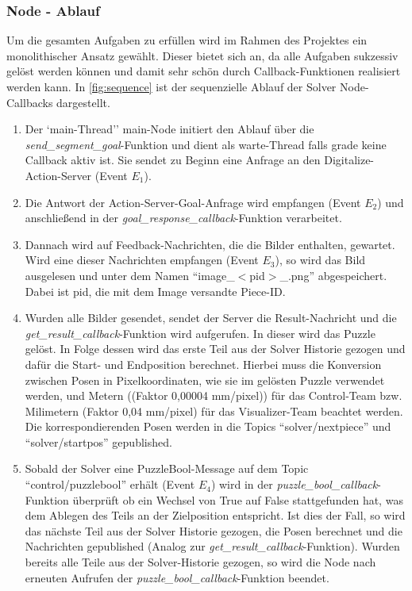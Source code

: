 \subsubsection{Node - Ablauf}
Um die gesamten Aufgaben zu erfüllen wird im Rahmen des Projektes ein monolithischer Ansatz gewählt. Dieser bietet sich an, da alle Aufgaben sukzessiv gelöst werden können und damit sehr schön durch Callback-Funktionen realisiert werden kann. In \autoref{fig:sequence} ist der sequenzielle Ablauf der Solver Node-Callbacks dargestellt. 
\begin{enumerate}
    \item Der `main-Thread'' main-Node initiert den Ablauf über die \textit{send\_segment\_goal}-Funktion und dient als warte-Thread falls grade keine Callback aktiv ist. Sie sendet zu Beginn eine Anfrage an den Digitalize-Action-Server (Event $E_1$). 
    \item Die Antwort der Action-Server-Goal-Anfrage wird empfangen (Event $E_2$) und anschließend in der \textit{goal\_response\_callback}-Funktion verarbeitet.
    \item Dannach wird auf Feedback-Nachrichten, die die Bilder enthalten, gewartet. Wird eine dieser Nachrichten empfangen (Event $E_3$), so wird das Bild ausgelesen und unter dem Namen ``image\_$<$pid$>$\_.png'' abgespeichert. Dabei ist pid, die mit dem Image versandte Piece-ID.
    \item Wurden alle Bilder gesendet, sendet der Server die Result-Nachricht und die \textit{get\_result\_callback}-Funktion wird aufgerufen. In dieser wird das Puzzle gelöst. In Folge dessen wird das erste Teil aus der Solver Historie gezogen und dafür die Start- und Endposition berechnet. Hierbei muss die Konversion zwischen Posen in Pixelkoordinaten, wie sie im gelösten Puzzle verwendet werden, und Metern ((Faktor 0,00004 mm/pixel)) für das Control-Team bzw. Milimetern (Faktor 0,04 mm/pixel) für das Visualizer-Team beachtet werden. Die korrespondierenden Posen werden in die Topics ``solver/nextpiece'' und ``solver/startpos'' gepublished.
    \item Sobald der Solver eine PuzzleBool-Message auf dem Topic ``control/puzzlebool'' erhält (Event $E_4$) wird in der \textit{puzzle\_bool\_callback}-Funktion überprüft ob ein Wechsel von True auf False stattgefunden hat, was dem Ablegen des Teils an der Zielposition entspricht. Ist dies der Fall, so wird das nächste Teil aus der Solver Historie gezogen, die Posen berechnet und die Nachrichten gepublished (Analog zur \textit{get\_result\_callback}-Funktion). Wurden bereits alle Teile aus der Solver-Historie gezogen, so wird die Node nach erneuten Aufrufen der \textit{puzzle\_bool\_callback}-Funktion beendet.
\end{enumerate}
     

